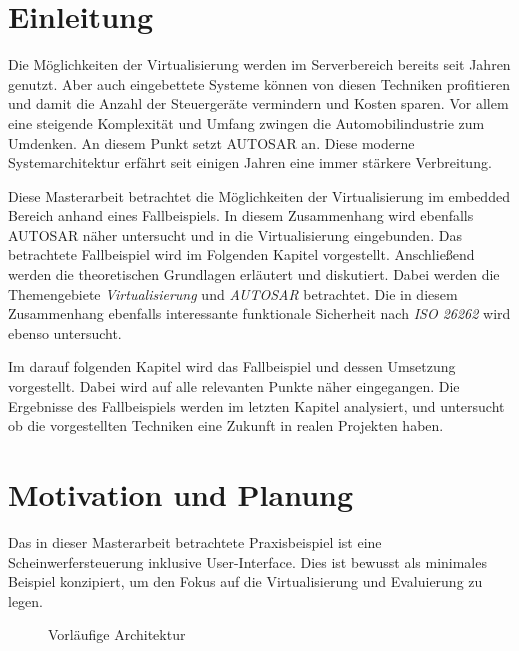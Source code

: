 \documentclass[
  a4paper,					    %
  twoside,
  DIV=calc,     				%
  bibliography=totoc,
  cleardoublepage=empty,
  ngerman,     					%
  final       					%
]{scrbook}
\begin{document}
\mainmatter
\chapter{Einleitung}
\label{sec:Einleitung}
Die Möglichkeiten der Virtualisierung werden im Serverbereich bereits seit Jahren genutzt. Aber auch eingebettete Systeme können von diesen Techniken profitieren und damit die Anzahl der Steuergeräte vermindern und Kosten sparen. Vor allem eine steigende Komplexität und Umfang zwingen die Automobilindustrie zum Umdenken. An diesem Punkt setzt AUTOSAR an. Diese moderne Systemarchitektur erfährt seit einigen Jahren eine immer stärkere Verbreitung. 

Diese Masterarbeit betrachtet die Möglichkeiten der Virtualisierung im embedded Bereich anhand eines Fallbeispiels. In diesem Zusammenhang wird ebenfalls AUTOSAR näher untersucht und in die Virtualisierung eingebunden. Das betrachtete Fallbeispiel wird im Folgenden Kapitel vorgestellt. Anschließend werden die theoretischen Grundlagen erläutert und diskutiert. Dabei werden die Themengebiete \emph{Virtualisierung} und \emph{AUTOSAR} betrachtet. Die in diesem Zusammenhang ebenfalls interessante funktionale Sicherheit nach \emph{ISO 26262} wird ebenso untersucht.

Im darauf folgenden Kapitel wird das Fallbeispiel und dessen Umsetzung vorgestellt. Dabei wird auf alle relevanten Punkte näher eingegangen. Die Ergebnisse des Fallbeispiels werden im letzten Kapitel analysiert, und untersucht ob die vorgestellten Techniken eine Zukunft in realen Projekten haben.




\chapter{Motivation und Planung}
\label{sec:MotivationPlanung}
Das in dieser Masterarbeit betrachtete Praxisbeispiel ist eine Scheinwerfersteuerung inklusive User-Interface. Dies ist bewusst als minimales Beispiel konzipiert, um den Fokus auf die Virtualisierung und Evaluierung zu legen.

\begin{figure}[ht]
    \centering
    
    \caption{Vorläufige Architektur}
    \label{fig:arch_begin}
\end{figure}
\end{document}
